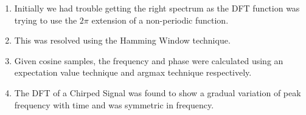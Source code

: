 \documentclass[12pt]{article}
\begin{document}
\begin{enumerate}
    \item Initially we had trouble getting the right spectrum as the DFT function was trying to use the $2\pi$ extension of a non-periodic function.
    \item This was resolved using the Hamming Window technique.
    \item Given cosine samples, the frequency and phase were calculated using an expectation value technique and argmax technique respectively.
    \item The DFT of a Chirped Signal was found to show a gradual variation of peak frequency with time and was symmetric in frequency.
\end{enumerate}
\end{document}
